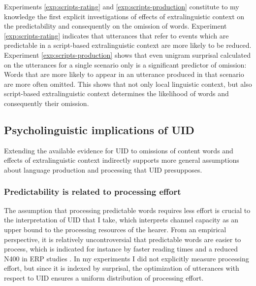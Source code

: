 Experiments \ref{exp:scripts-rating} and \ref{exp:scripts-production} constitute to my knowledge the first explicit investigations of effects of extralinguistic context on the predictability and consequently on the omission of words. Experiment \ref{exp:scripts-rating} indicates that utterances that refer to events which are predictable in a script-based extralinguistic context are more likely to be reduced. Experiment \ref{exp:scripts-production} shows that even unigram surprisal calculated on the utterances for a single scenario only is a significant predictor of omission: Words that are more likely to appear in an utterance produced in that scenario are more often omitted. This shows that not only local linguistic context, but also script-based extralinguistic context determines the likelihood of words and consequently their omission.

\subsection{Psycholinguistic implications of UID}
Extending the available evidence for UID to omissions of content words and effects of extralinguistic context indirectly supports more general assumptions about language production and processing that UID presupposes. 

\subsubsection{Predictability is related to processing effort}
The assumption that processing predictable words requires less effort is crucial to the interpretation of UID that I take, which interprets channel capacity as an upper bound to the processing resources of the hearer. From an empirical perspective, it is relatively uncontroversial that predictable words are easier to process, which is indicated for instance by faster reading times \citep{demberg.keller2008, levy2008, smith.levy2013, brothers.kuperberg2019} and a reduced N400 in ERP studies \citep{frank.etal2015, delogu.etal2017}. In my experiments I did not explicitly measure processing effort, but since it is indexed by surprisal, the optimization of utterances with respect to UID ensures a uniform distribution of processing effort.

